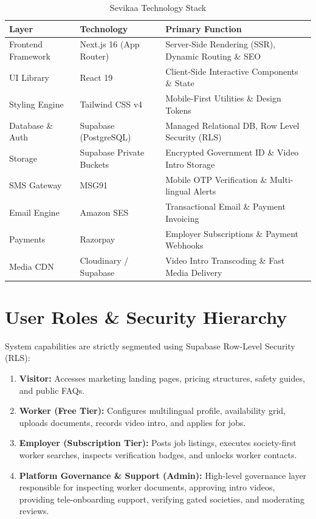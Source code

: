 \documentclass[11pt,a4paper]{article}
\begin{document}
\begin{table}[h!]
\centering
\caption{Sevikaa Technology Stack}
\vspace{0.5em}
\begin{tabular}{lll}
\toprule
\textbf{Layer} & \textbf{Technology} & \textbf{Primary Function} \\
\midrule
Frontend Framework & Next.js 16 (App Router) & Server-Side Rendering (SSR), Dynamic Routing \& SEO \\
UI Library & React 19 & Client-Side Interactive Components \& State \\
Styling Engine & Tailwind CSS v4 & Mobile-First Utilities \& Design Tokens \\
Database \& Auth & Supabase (PostgreSQL) & Managed Relational DB, Row Level Security (RLS) \\
Storage & Supabase Private Buckets & Encrypted Government ID \& Video Intro Storage \\
SMS Gateway & MSG91 & Mobile OTP Verification \& Multi-lingual Alerts \\
Email Engine & Amazon SES & Transactional Email \& Payment Invoicing \\
Payments & Razorpay & Employer Subscriptions \& Payment Webhooks \\
Media CDN & Cloudinary / Supabase & Video Intro Transcoding \& Fast Media Delivery \\
\bottomrule
\end{tabular}
\end{table}

\section{User Roles \& Security Hierarchy}
System capabilities are strictly segmented using Supabase Row-Level Security (RLS):
\begin{enumerate}[noitemsep]
    \item \textbf{Visitor:} Accesses marketing landing pages, pricing structures, safety guides, and public FAQs.
    \item \textbf{Worker (Free Tier):} Configures multilingual profile, availability grid, uploads documents, records video intro, and applies for jobs.
    \item \textbf{Employer (Subscription Tier):} Posts job listings, executes society-first worker searches, inspects verification badges, and unlocks worker contacts.
    \item \textbf{Platform Governance \& Support (Admin):} High-level governance layer responsible for inspecting worker documents, approving intro videos, providing tele-onboarding support, verifying gated societies, and moderating reviews.
\end{enumerate}
\end{document}
